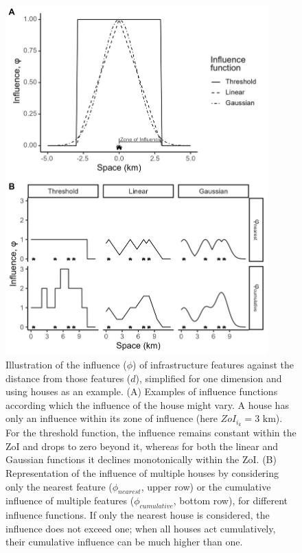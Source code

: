 \documentclass[titlepage]{article}
\begin{document}
{\begin{figure}[h]
\centering
\includegraphics[width=0.9\textwidth]{figures/ZoI_conceptual.png}
\caption{\label{fig:zoi_conceptual} Illustration of the influence ($\phi$) of infrastructure features against the distance from those features ($d$), simplified for one dimension and using houses as an example. (A) Examples of influence functions according which the influence of the house might vary. A house has only an influence within its zone of influence (here $ZoI_{i_k} = 3 \text{ km}$). For the threshold function, the influence remains constant within the ZoI and drops to zero beyond it, whereas for both the linear and Gaussian functions it declines monotonically within the ZoI. 
(B) Representation of the influence of multiple houses by considering only the nearest feature ($\phi_{nearest}$, upper row) or the cumulative influence of multiple features ($\phi_{cumulative}$, bottom row), for different influence functions. If only the nearest house is considered, the influence does not exceed one; when all houses act cumulatively, their cumulative influence can be much higher than one.}
\end{figure}

}
\end{document}
